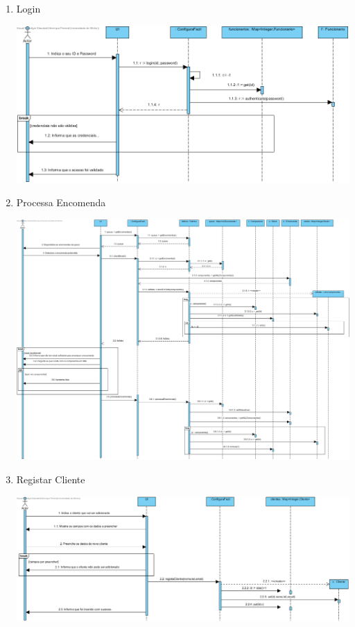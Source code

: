\documentclass[11pt]{article} %
\begin{document}
\begin{enumerate}
\begin{center}
		\end{center}
	\item Login
		\begin{center}
 			\includegraphics[width = 6in]{dsi_login.png}
		\end{center}
	\item Processa Encomenda
		\begin{center}
 			\includegraphics[width = 6in]{dsi_processar_encomenda.png}
		\end{center}
	\item Registar Cliente
		\begin{center}
 			\includegraphics[width = 6in]{dsi_registar_cliente.png}

\end{center}
\end{enumerate}
\end{document}
